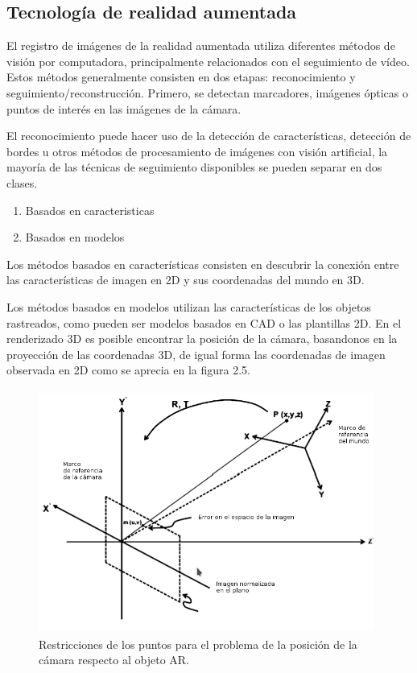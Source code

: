 \subsection{Tecnología de realidad aumentada}
El registro de imágenes de la realidad aumentada utiliza diferentes métodos de visión por computadora, principalmente relacionados con el seguimiento de vídeo. Estos métodos generalmente consisten en dos etapas: reconocimiento y seguimiento/reconstrucción. Primero, se detectan marcadores, imágenes ópticas o puntos de interés en las imágenes de la cámara.\cite{B27} \par
\vspace{5mm}
El reconocimiento puede hacer uso de la detección de características, detección de bordes u otros métodos de procesamiento de imágenes con visión artificial, la mayoría de las técnicas de seguimiento disponibles se pueden separar en dos clases. \par
\begin{enumerate}[1.]
	\item Basados en caracteristicas
	\item Basados en modelos
\end{enumerate}

\vspace{5mm}
Los métodos basados en características consisten en descubrir la conexión entre las características de imagen en 2D y sus coordenadas del mundo en 3D. \par
\vspace{5mm}
Los métodos basados en modelos utilizan las características de los objetos rastreados, como pueden ser modelos basados en CAD o las plantillas 2D. En el renderizado 3D es posible encontrar la posición de la cámara, basandonos en la proyección de las coordenadas 3D, de igual forma las coordenadas de imagen observada en 2D  como se aprecia en la figura 2.5.\par
\begin{figure}[h!]
	\centering
	\includegraphics[width=11cm,height=8cm]{imagenes/marcoteorico/ar/tecnologyAR.png}
	\caption{Restricciones de los puntos para el problema de la posición de la cámara respecto al objeto AR\cite{B27}.}
	\label{fig:analogo}
\end{figure}
